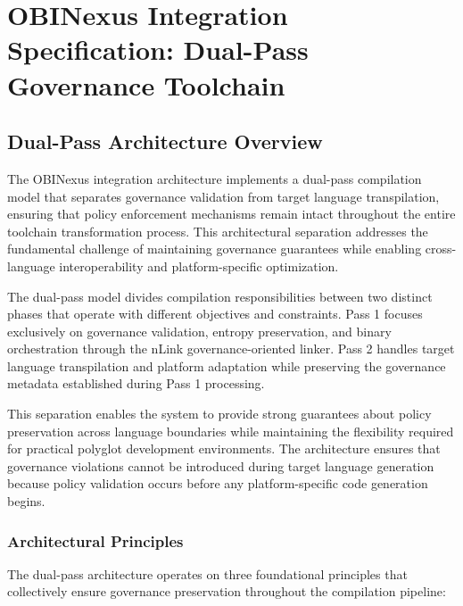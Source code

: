 \chapter{OBINexus Integration Specification: Dual-Pass Governance Toolchain}
\label{ch:obinexus-integration}

\section{Dual-Pass Architecture Overview}

The OBINexus integration architecture implements a dual-pass compilation model that separates governance validation from target language transpilation, ensuring that policy enforcement mechanisms remain intact throughout the entire toolchain transformation process. This architectural separation addresses the fundamental challenge of maintaining governance guarantees while enabling cross-language interoperability and platform-specific optimization.

The dual-pass model divides compilation responsibilities between two distinct phases that operate with different objectives and constraints. Pass 1 focuses exclusively on governance validation, entropy preservation, and binary orchestration through the nLink governance-oriented linker. Pass 2 handles target language transpilation and platform adaptation while preserving the governance metadata established during Pass 1 processing.

This separation enables the system to provide strong guarantees about policy preservation across language boundaries while maintaining the flexibility required for practical polyglot development environments. The architecture ensures that governance violations cannot be introduced during target language generation because policy validation occurs before any platform-specific code generation begins.

\subsection{Architectural Principles}

The dual-pass architecture operates on three foundational principles that collectively ensure governance preservation throughout the compilation pipeline:

